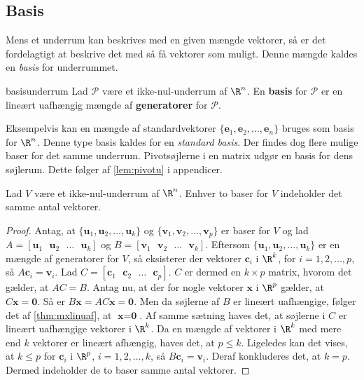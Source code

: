 \subsection{Basis}
Mens et underrum kan beskrives med en given mængde vektorer, så er det fordelagtigt at beskrive det med så få vektorer som muligt. 
Denne mængde kaldes en \textit{basis} for underrummet.
%
\begin{defn}{}{basisunderrum}
Lad $\mathcal{P}$ være et ikke-nul-underrum af $\R^n$. 
En \textbf{basis} for $\mathcal{P}$ er en lineært uafhængig mængde af \textbf{generatorer} for $\mathcal{P}$.
\end{defn}
\noindent
Eksempelvis kan en mængde af standardvektorer $\{\textbf{e}_1,\textbf{e}_2,\ldots,\textbf{e}_n\}$ bruges som basis for $\R^n$.
Denne type basis kaldes for en \textit{standard basis}.
Der findes dog flere mulige baser for det samme underrum.
%
Pivotsøjlerne i en matrix udgør en basis for dens søjlerum.
Dette følger af \ref{lem:pivotu} i appendicer.
%
\begin{thm}{}{}
Lad $V$ være et ikke-nul-underrum af $\R^n$. Enhver to baser for $V$ indeholder det samme antal vektorer.
\end{thm}
\begin{proof}
Antag, at $\{\textbf{u}_1,\textbf{u}_2,\ldots,\textbf{u}_k\} $ og $\{\textbf{v}_1,\textbf{v}_2,\ldots,\textbf{v}_p\} $ er baser for $V$ og lad $A=[\textbf{u}_1 \text{ } \textbf{u}_2 \text{ }  \ldots \text{ } \textbf{u}_k] $ og $B=[\textbf{v}_1 \text{ } \textbf{v}_2 \text{ }  \ldots \text{ } \textbf{v}_k] $.
Eftersom $\{\textbf{u}_1,\textbf{u}_2,\ldots,\textbf{u}_k\} $ er en mængde af generatorer for $V$, så eksisterer der vektorer $\textbf{c}_i$ i $\R^k$, for $i=1,2,\ldots,p$, så $A\textbf{c}_i=\textbf{v}_i$.
Lad $C=[\textbf{c}_1 \text{ } \textbf{c}_2 \text{ } \ldots \text{ } \textbf{c}_p]$.
$C$ er dermed en $ k \times p$ matrix, hvorom det gælder, at $AC=B$.
Antag nu, at der for nogle vektorer $\textbf{x}$ i $\R^p$ gælder, at $C\textbf{x}=\textbf{0}$. 
Så er $B\textbf{x}=AC\textbf{x}=\textbf{0}$. 
Men da søjlerne af $B$ er lineært uafhængige, følger det af \ref{thm:mxlinuaf}, at $\textbf{x}=\textbf{0}$.
Af samme sætning haves det, at søjlerne i $C$ er lineært uafhængige vektorer i $\R^k$.
Da en mængde af vektorer i $\R^k$ med mere end $k$ vektorer er lineært afhængig, haves det, at $p\leq k$. 
Ligeledes kan det vises, at $k \leq p$ for $\textbf{c}_i$ i $\R^p$, $i=1,2,\ldots,k$, så $B\textbf{c}_i=\textbf{v}_i$. 
Deraf konkluderes det, at $k=p$.
Dermed indeholder de to baser samme antal vektorer. 
\end{proof}